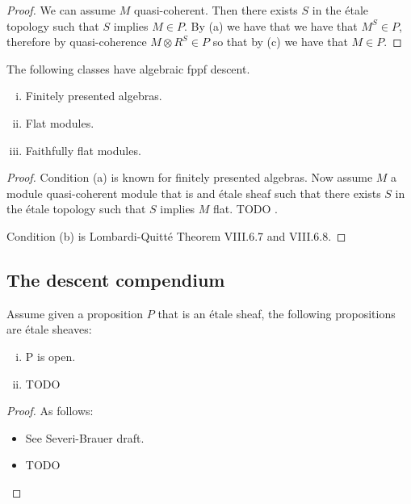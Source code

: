 \begin{proof}
We can assume $M$ quasi-coherent. Then there exists $S$ in the \'etale topology such that $S$ implies $M\in P$. By (a) we have that we have that $M^S\in P$, therefore by quasi-coherence $M\otimes R^S \in P$ so that by (c) we have that $M\in P$. 
\end{proof}

\begin{lemma}\label{lombardi-algebraic-descent}
The following classes have algebraic fppf descent.
\begin{enumerate}[(i)]
\item Finitely presented algebras.
\item Flat modules. 
\item Faithfully flat modules. 
\end{enumerate}
\end{lemma}

\begin{proof}
Condition (a) is known for finitely presented algebras. Now assume $M$ a module quasi-coherent module that is and \'etale sheaf such that there exists $S$ in the \'etale topology such that $S$ implies $M$ flat. TODO .

Condition (b) is Lombardi-Quitt\'e Theorem VIII.6.7 and VIII.6.8.
\end{proof}



\subsection{The descent compendium}

\begin{proposition}\label{proposition-all-descent}
Assume given a proposition $P$ that is an \'etale sheaf, the following propositions are \'etale sheaves:
\begin{enumerate}[(i)]
\item P is open.
\item TODO
\end{enumerate}
\end{proposition}

\begin{proof}
As follows:
\begin{itemize}
\item[(i)] See Severi-Brauer draft.
\item TODO
\end{itemize}
\end{proof}

